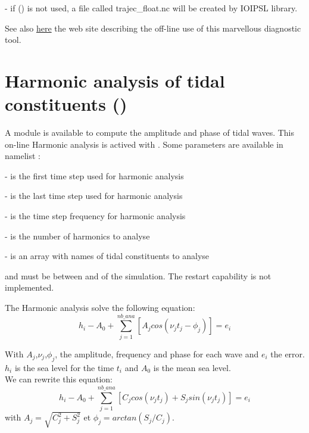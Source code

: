 \documentclass[NEMO_book]{subfiles}
\begin{document}
 -  if () is not used, a file called trajec\_float.nc will be created by IOIPSL library.



See also \href{http://stockage.univ-brest.fr/~grima/Ariane/}{here} the web site describing 
the off-line use of this marvellous diagnostic tool.


\section{Harmonic analysis of tidal constituents () }
\label{DIA_diag_harm}


A module is available to compute the amplitude and phase of tidal waves. 
This on-line Harmonic analysis is actived with .
Some parameters are available in namelist  :

-  is the first time step used for harmonic analysis

-  is the last time step used for harmonic analysis

-  is the time step frequency for harmonic analysis

-  is the number of harmonics to analyse

-  is an array with names of tidal constituents to analyse

 and  must be between  and  of the simulation.
The restart capability is not implemented.

The Harmonic analysis solve the following equation:
\begin{equation}
h_{i} - A_{0} + \sum^{nb\_ana}_{j=1}[A_{j}cos(\nu_{j}t_{j}-\phi_{j})] = e_{i}
\end{equation}

With $A_{j}$,$\nu_{j}$,$\phi_{j}$, the amplitude, frequency and phase for each wave and $e_{i}$ the error.
$h_{i}$ is the sea level for the time $t_{i}$ and $A_{0}$ is the mean sea level. \\
We can rewrite this equation:
\begin{equation}
h_{i} - A_{0} + \sum^{nb\_ana}_{j=1}[C_{j}cos(\nu_{j}t_{j})+S_{j}sin(\nu_{j}t_{j})] = e_{i}
\end{equation}
with $A_{j}=\sqrt{C^{2}_{j}+S^{2}_{j}}$ et $\phi_{j}=arctan(S_{j}/C_{j})$.
\end{document}
